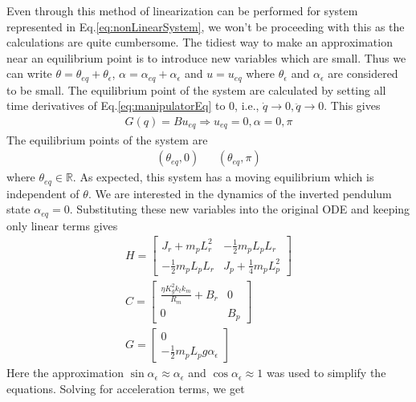 \documentclass[superscriptaddress,floatfix,reprint,amssymb, amsmath,aps, pre]{revtex4-1}
\newcommand{\R}{\mathbb{R}}
\newcommand{\aee}{\alpha_\epsilon}
\newcommand{\tee}{\theta_\epsilon}
\begin{document}
{{        Even through this method of linearization can be performed for system represented in Eq.\ref{eq:nonLinearSystem}, we won't be proceeding with this as the calculations are quite cumbersome. The tidiest way to make an approximation near an equilibrium point is to introduce new variables which are small.  Thus we can write \(\theta = \theta_{eq} + \theta_\epsilon\), \(\alpha = \alpha_{eq} +\alpha_\epsilon\) and \(u = u_{eq}\) where \(\tee\) and \(\aee\) are considered to be small. The equilibrium point of the system are calculated by setting all time derivatives of Eq.\ref{eq:manipulatorEq} to \(0\), i.e., \(\dot{q} \to 0, \ddot q \to 0\). This gives 
        \begin{gather}
            G(q) = B u_{eq} \Rightarrow u_{eq} = 0, \alpha = 0,\pi \nonumber
        \end{gather}
        The equilibrium points of the system are
        \begin{align*}
            (\theta_{eq},0) && (\theta_{eq},\pi)
        \end{align*}
        where \(\theta_{eq} \in \R\). As expected, this system has a moving equilibrium which is independent of \(\theta\). We are interested in the dynamics of the inverted pendulum state \(\alpha_{eq} = 0\). Substituting these new variables into the original ODE and keeping only linear terms gives 
        \begin{gather}
            H = \begin{bmatrix}
                J_r + m_p L_r^2 & -\frac{1}{2} m_p L_p L_r\\
                -\frac{1}{2} m_p L_p L_r & J_p +\frac{1}{4} m_p L_p^2
            \end{bmatrix}\\
            C = \begin{bmatrix}
                \frac{\eta K_g^2 k_t k_m}{R_m} + B_r & 0 \\
                0 & B_p
            \end{bmatrix}\\
            G = \begin{bmatrix}
                0\\
                -\frac{1}{2} m_p L_p g \aee 
            \end{bmatrix}
        \end{gather}
        Here the approximation \(\sin\aee \approx \aee\) and \(\cos\aee \approx 1\) was used to simplify the equations. Solving for acceleration terms, we get 
        \begin{gather}

\end{gather}}}
\end{document}
